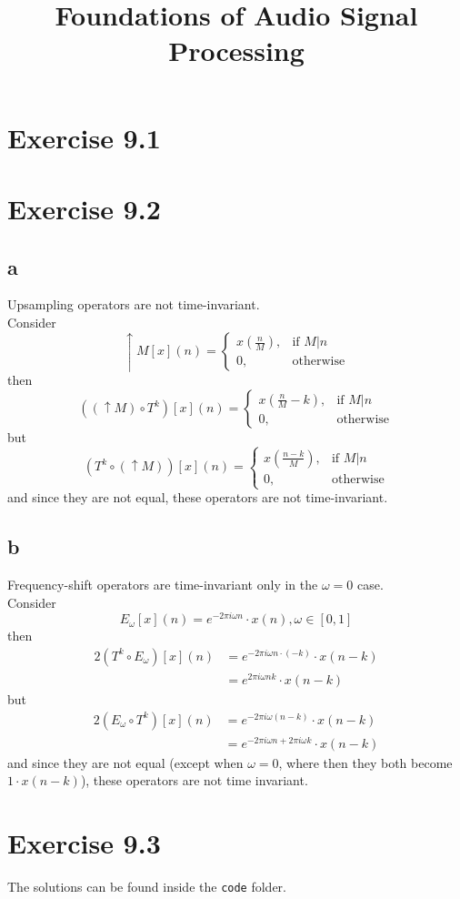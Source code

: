 \documentclass[12pt]{article}
\title{Foundations of Audio Signal Processing\\ \ass}
\author{\auth}
\begin{document}
	\maketitle
	\section*{Exercise 9.1}
	\section*{Exercise 9.2}
	\subsection*{a} Upsampling operators are not time-invariant.\\
	Consider
	\begin{equation}
		\uparrow M[x](n) = \begin{cases}
		x(\frac{n}{M}), & \mbox{if } M\vert n\\ 
		0, & \mbox{otherwise}
		\end{cases}
	\end{equation}
	then
	\begin{equation}
		((\uparrow M)\circ T^k)[x](n) = \begin{cases}
		x(\frac{n}{M} - k), & \mbox{if } M\vert n\\
		0, & \mbox{otherwise}
		\end{cases}
	\end{equation}
	but
	\begin{equation}
	(T^k \circ (\uparrow M))[x](n) = \begin{cases}
	x(\frac{n-k}{M}), & \mbox{if } M\vert n\\
	0, & \mbox{otherwise}
	\end{cases}
	\end{equation}
	and since they are not equal, these operators are not time-invariant.
	
	\subsection*{b} Frequency-shift operators are time-invariant only in the $\omega = 0$ case.\\
	Consider
	\begin{equation}
		E_\omega[x](n) = e^{-2\pi i \omega n} \cdot x(n), \omega \in [0,1]
	\end{equation}
	then
	\begin{alignat}{2}
		(T^k \circ E_\omega)[x](n) &= e^{-2\pi i \omega n \cdot (- k)} \cdot x(n-k)\\
		&= e^{2\pi i \omega n k} \cdot x(n-k)
	\end{alignat}
	but
	\begin{alignat}{2}
		(E_\omega \circ T^k)[x](n) &= e^{-2\pi i \omega (n - k)} \cdot x(n-k)\\
		&= e^{-2\pi i \omega n + 2\pi i \omega k} \cdot x(n-k)
	\end{alignat}
	and since they are not equal (except when $\omega=0$, where then they both become $1 \cdot x(n-k)$), these operators are not time invariant.
	\section*{Exercise 9.3}
	The solutions can be found inside the \texttt{code} folder.
\end{document}
